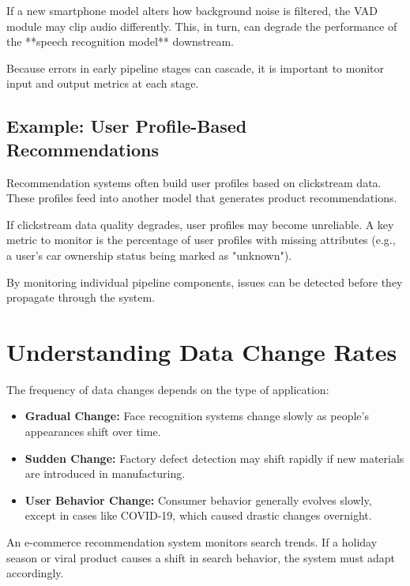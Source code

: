 \documentclass[12pt,openany, draft]{book}
\begin{document}
\begin{examplebox}
   If a new smartphone model alters how background noise is filtered, the VAD module may clip audio differently. This, in turn, can degrade the performance of the **speech recognition model** downstream.
\end{examplebox}

Because errors in early pipeline stages can cascade, it is important to monitor input and output metrics at each stage.


\subsection{Example: User Profile-Based Recommendations}

Recommendation systems often build user profiles based on clickstream data. These profiles feed into another model that generates product recommendations.

\begin{examplebox}
   If clickstream data quality degrades, user profiles may become unreliable. A key metric to monitor is the percentage of user profiles with missing attributes (e.g., a user's car ownership status being marked as "unknown").
\end{examplebox}

By monitoring individual pipeline components, issues can be detected before they propagate through the system.



\section{Understanding Data Change Rates}

The frequency of data changes depends on the type of application:

\begin{itemize}
    \item \textbf{Gradual Change:} Face recognition systems change slowly as people's appearances shift over time.
    \item \textbf{Sudden Change:} Factory defect detection may shift rapidly if new materials are introduced in manufacturing.
    \item \textbf{User Behavior Change:} Consumer behavior generally evolves slowly, except in cases like COVID-19, which caused drastic changes overnight.
\end{itemize}

\begin{examplebox}
   An e-commerce recommendation system monitors search trends. If a holiday season or viral product causes a shift in search behavior, the system must adapt accordingly.
\end{examplebox}
\end{document}

